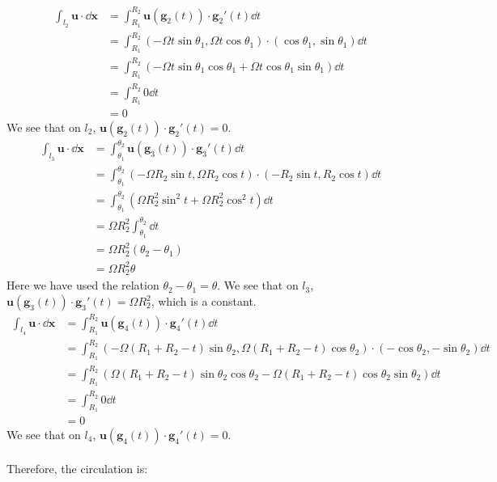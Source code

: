 \documentclass{article}
\begin{document}
\begin{enumerate}
\begin{enumerate}
\begin{align*}
    \int_{l_2} \mathbf{u}\cdot \dd\mathbf{x}
    &= \int_{R_1}^{R_2} \mathbf{u}(\mathbf{g}_2(t))\cdot \mathbf{g}_2'(t) \dd t\\
    &= \int_{R_1}^{R_2} (-\Omega  t\sin \theta_1 , \Omega  t\cos \theta_1)\cdot (\cos\theta_1, \sin\theta_1) \dd t\\
    &= \int_{R_1}^{R_2} (-\Omega t \sin\theta_1\cos\theta_1 + \Omega  t \cos \theta_1\sin\theta_1)\dd t\\
    &= \int_{R_1}^{R_2} 0 \dd t\\
    &= 0
  \end{align*}
   We see that on \(l_2\), \(\mathbf{u}(\mathbf{g}_2(t))\cdot \mathbf{g}_2'(t) = 0\).
   \begin{align*}
     \int_{l_3} \mathbf{u}\cdot \dd\mathbf{x}
     &= \int_{\theta_1}^{\theta_2} \mathbf{u}(\mathbf{g}_3(t))\cdot \mathbf{g}_3'(t) \dd t\\
     &= \int_{\theta_1}^{\theta_2} (-\Omega R_2\sin t, \Omega R_2\cos t)\cdot (-R_2 \sin t, R_2\cos t) \dd t\\
     &= \int_{\theta_1}^{\theta_2} (\Omega R_2^2 \sin^2 t + \Omega R_2^2 \cos^2 t) \dd t\\
     &= \Omega R_2^2 \int_{\theta_1}^{\theta_2} \dd t \\
     &= \Omega R_2^2 (\theta_2 -\theta_1)\\
     &= \Omega R_2^2 \theta
   \end{align*}
   Here we have used the relation \(\theta_2-\theta_1=\theta\). We see that on \(l_3\), \(\mathbf{u}(\mathbf{g}_3(t))\cdot \mathbf{g}_3'(t) = \Omega R_2^2\), which is a constant.
   \begin{align*}
     \int_{l_4} \mathbf{u}\cdot \dd\mathbf{x}
     &= \int_{R_1}^{R_2} \mathbf{u}(\mathbf{g}_4(t))\cdot \mathbf{g}_4'(t) \dd t\\
     &= \int_{R_1}^{R_2}(-\Omega (R_1+R_2 - t)\sin \theta_2, \Omega (R_1+R_2-t)\cos\theta_2)\cdot (-\cos \theta_2, -\sin\theta_2)\dd t\\
     &= \int_{R_1}^{R_2} (\Omega (R_1+R_2 - t)\sin \theta_2\cos \theta_2 - \Omega (R_1+R_2-t)\cos\theta_2 \sin\theta_2)\dd t\\
     &= \int_{R_1}^{R_2} 0 \dd t\\
     &= 0
   \end{align*}
   We see that on \(l_4\), \(\mathbf{u}(\mathbf{g}_4(t))\cdot \mathbf{g}_4'(t) = 0\).\\
   \\
   Therefore, the circulation is:
   \begin{align*}

\end{align*}
\end{enumerate}
\end{enumerate}
\end{document}
